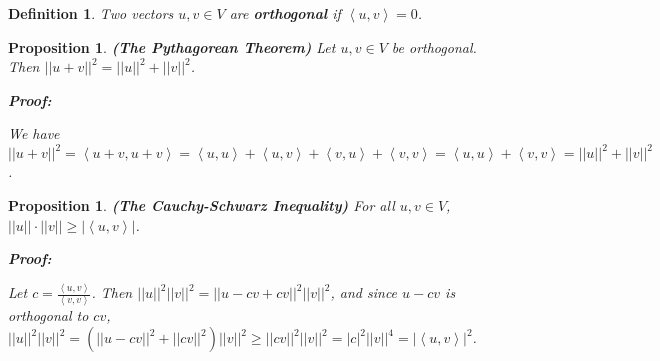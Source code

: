 \documentclass{article}
\theoremstyle{colontheorem}
\newtheorem{proposition}[theorem]{Proposition}
\newtheorem{definition}[theorem]{Definition}
\newenvironment{Proposition}
{
	\begin{mdframed}[backgroundcolor=TheoremOrange!10]
	\begin{proposition}
}
{
	\end{proposition}
	\end{mdframed}
	
	\vspace{.15in}
}
\newenvironment{Def}
{
	\begin{mdframed}[backgroundcolor=DefGreen!10]
	\begin{definition}
}
{
	\end{definition}
	\end{mdframed}
	
	\vspace{.15in}
}
\newenvironment{Proof}
{
	\begin{mdframed}[backgroundcolor=ProofPurple!10]
	\textbf{Proof:}%
}
{
	\end{mdframed}
	
	\vspace{.085in}
}
\begin{document}
\begin{Def}
	
	Two vectors $u, v \in V$ are \textbf{orthogonal} if $\left< u, v \right> = 0$.
	
\end{Def}



\begin{Proposition}
	
	\textbf{(The Pythagorean Theorem)} Let $u, v \in V$ be orthogonal. Then $||u + v||^2 = ||u||^2 + ||v||^2$.
	
	\begin{Proof}
		We have $||u + v||^2 = \left< u+v, u+v \right> = \left< u, u \right> + \left< u, v \right> + \left< v, u \right> + \left< v, v \right> = \left< u, u \right> + \left< v, v \right> = ||u||^2 + ||v||^2$.
		
	\end{Proof}
	
\end{Proposition}



\begin{Proposition}
	
	\textbf{(The Cauchy-Schwarz Inequality)} For all $u, v \in V$, $||u|| \cdot ||v|| \geq | \left< u, v \right> |$.
	
	\begin{Proof}
		Let $c = \frac{\left< u, v \right>}{\left< v, v \right>}$. Then $||u||^2 ||v||^2 = ||u - cv + cv||^2 ||v||^2$, and since $u - cv$ is orthogonal to $cv$, $||u||^2 ||v||^2 = \left( ||u - cv||^2 + ||cv||^2 \right) ||v||^2 \geq ||cv||^2 ||v||^2 = |c|^2 ||v||^4 = | \left< u, v \right> |^2$.
		
	\end{Proof}
	
\end{Proposition}
\end{document}
